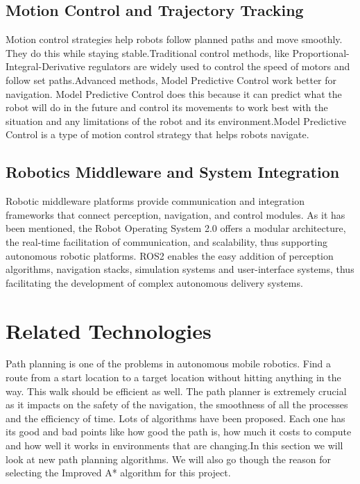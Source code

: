 \subsection{Motion Control and Trajectory Tracking}

Motion control strategies help robots follow planned paths and move smoothly. They do this while staying stable.Traditional control methods, like Proportional-Integral-Derivative regulators are widely used to control the speed of motors and follow set paths.Advanced methods, Model Predictive Control work better for navigation. Model Predictive Control does this because it can predict what the robot will do in the future and control its movements to work best with the situation and any limitations of the robot and its environment.Model Predictive Control is a type of motion control strategy that helps robots navigate.
\subsection{Robotics Middleware and System Integration}

\begin{sloppypar}
	Robotic middleware platforms provide communication and integration frameworks that connect perception, navigation, and control modules. As it has been mentioned, the Robot Operating System 2.0 offers a modular architecture, the real-time facilitation of communication, and scalability, thus supporting autonomous robotic platforms. ROS2 enables the easy addition of perception algorithms, navigation stacks, simulation systems and user-interface systems, thus facilitating the development of complex autonomous delivery systems.
\end{sloppypar}

\section{Related Technologies}

Path planning is one of the problems in autonomous mobile robotics. Find a route from a start location to a target location without hitting anything in the way. This walk should be efficient as well. The path planner is extremely crucial as it impacts on the safety of the navigation, the smoothness of all the processes and the efficiency of time. Lots of algorithms have been proposed. Each one has its good and bad points like how good the path is, how much it costs to compute and how well it works in environments that are changing.In this section we will look at new path planning algorithms. We will also go though the reason for selecting the Improved A* algorithm for this project.

